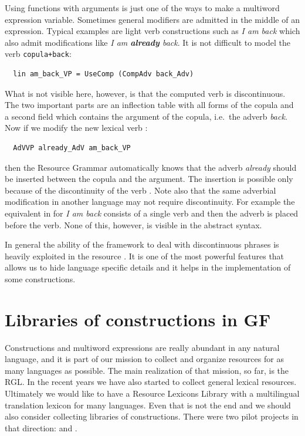 \documentclass[output=paper]{langsci/langscibook}
\begin{document}
Using functions with arguments is just one of the ways to make
a multiword expression variable. Sometimes general modifiers 
are admitted in the middle of an expression.
Typical examples are light verb constructions such as \textit{I am back}
which also admit modifications like \textit{I am \textbf{already} back}.
It is not difficult to model the verb  \verb=copula+back=:
\begin{verbatim}
  lin am_back_VP = UseComp (CompAdv back_Adv)
\end{verbatim}
What is not visible here, however, is that the computed verb 
is discontinuous. The two important parts are an inflection table with
all forms of the copula and a second field which contains the argument
of the copula, i.e.\ the adverb \textit{back}. 
Now if we modify the new lexical verb :
\begin{verbatim}
  AdVVP already_AdV am_back_VP
\end{verbatim}
then the Resource Grammar automatically knows that the adverb
\textit{already} should be inserted between the copula and the argument.
The insertion is possible only because of the discontinuity of 
the verb . Note also that the same adverbial modification in another
language may not require discontinuity. For example the equivalent in
 for \textit{I am back} consists of a single verb and then 
the adverb is placed before the verb. None of this, however, is
visible in the abstract syntax.

In general the ability of the framework to deal with discontinuous phrases
is heavily exploited in the resource . It is one of the most powerful
features that allows us to hide language specific details and it helps
in the implementation of some constructions.

\section{Libraries of constructions in GF}

Constructions and multiword expressions are really abundant in 
any natural language, and it is part of our mission to collect and 
organize  resources for as many languages as possible. The main
realization of that mission, so far, is the RGL.
In the recent years we have also started to collect general lexical
resources. Ultimately we would like to have a Resource Lexicons Library
with a multilingual translation lexicon for many languages.
Even that is not the end and we should also consider collecting libraries
of constructions. There were two pilot projects in that direction:
\cite{gruzitis2015formalising} and \cite{enache2014handling}.
 
\end{document}
